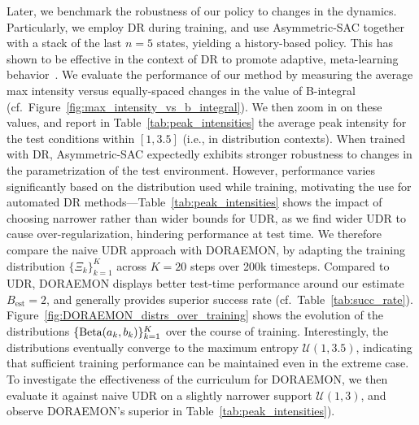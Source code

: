 Later, we benchmark the robustness of our policy to changes in the dynamics.
Particularly, we employ DR during training, and use Asymmetric-SAC together with a stack of the last $n=5$ states, yielding a history-based policy. This has shown to be effective in the context of DR to promote adaptive, meta-learning behavior~\citep{chen2021understanding, tiboni2023domain, akkaya2019solving}.
We evaluate the performance of our method by measuring the average max intensity versus equally-spaced changes in the value of B-integral (cf.~Figure~\ref{fig:max_intensity_vs_b_integral}). We then zoom in on these values, and report in Table~\ref{tab:peak_intensities} the average peak intensity for the test conditions within \( [1, 3.5] \) (i.e., in distribution contexts). When trained with DR, Asymmetric-SAC expectedly exhibits stronger robustness to changes in the parametrization of the test environment. However, performance varies significantly based on the distribution used while training, motivating the use for automated DR methods---Table~\ref{tab:peak_intensities} shows the impact of choosing narrower rather than wider bounds for UDR, as we find wider UDR to cause over-regularization, hindering performance at test time.
We therefore compare the naive UDR approach with DORAEMON, by adapting the training distribution \( \{ \Xi_{k} \}_{k=1}^K\) across $K=20$ steps over 200k timesteps. Compared to UDR, DORAEMON displays better test-time performance around our estimate $B_{\text{est}} = 2$, and generally provides superior success rate (cf.~Table~\ref{tab:succ_rate}).
Figure~\ref{fig:DORAEMON_distrs_over_training} shows the evolution of the distributions \(\{\text{Beta}(a_k, b_k) \}_{k=1}^{K} \) over the course of training.
Interestingly, the distributions eventually converge to the maximum entropy \( \mathcal U(1, 3.5) \), indicating that sufficient training performance can be maintained even in the extreme case. To investigate the effectiveness of the curriculum for DORAEMON, we then evaluate it against naive UDR on a slightly narrower support \( \mathcal U(1, 3) \), and observe DORAEMON's superior in Table~\ref{tab:peak_intensities}).

